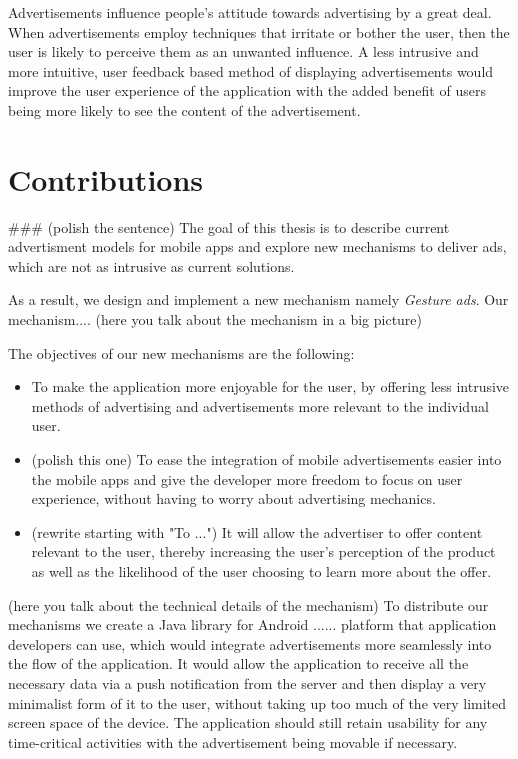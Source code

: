 Advertisements influence people's attitude towards advertising by a great deal. When advertisements employ techniques that irritate or bother the user, then the user is likely to perceive them as an unwanted influence.\cite{chowdhury2010consumer} A less intrusive and more intuitive, user feedback based method of displaying advertisements would improve the user experience of the application with the added benefit of users being more likely to see the content of the advertisement.

\section{Contributions}
### (polish the sentence) The goal of this thesis is to describe current advertisment models for mobile apps and explore new mechanisms to deliver ads, which are not as intrusive as current solutions.


As a result, we design and implement a new mechanism namely \textit{Gesture ads}. Our mechanism.... (here you talk about the mechanism in a big picture)


The objectives of our new mechanisms are the following:
\begin{itemize}
  \item To make the application more enjoyable for the user, by offering less intrusive methods of advertising and advertisements more relevant to the individual user.
  \item (polish this one) To ease the integration of mobile advertisements easier into the mobile apps and give the developer more freedom to focus on user experience, without having to worry about advertising mechanics.
  \item (rewrite starting with "To ...") It will allow the advertiser to offer content relevant to the user, thereby increasing the user's perception of the product as well as the likelihood of the user choosing to learn more about the offer.
\end{itemize}



(here you talk about the technical details of the mechanism) To distribute our mechanisms we create a Java library for Android \cite{android:platform} ...... platform that application developers can use, which would integrate advertisements more seamlessly into the flow of the application. It would allow the application to receive all the necessary data via a push notification from the server and then display a very minimalist form of it to the user, without taking up too much of the very limited screen space of the device. The application should still retain usability for any time-critical activities with the advertisement being movable if necessary.


